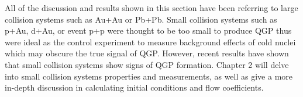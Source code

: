 All of the discussion and results shown in this section have been referring to large collision systems such as Au+Au or Pb+Pb. Small collision systems such as p+Au, d+Au, or event p+p were thought to be too small to produce QGP thus were ideal as the control experiment to measure background effects of cold nuclei which may obscure the true signal of QGP. However, recent results have shown that small collision systems show signs of QGP formation. Chapter 2 will delve into small collision systems properties and measurements, as well as give a more in-depth discussion in calculating initial conditions and flow coefficients.
